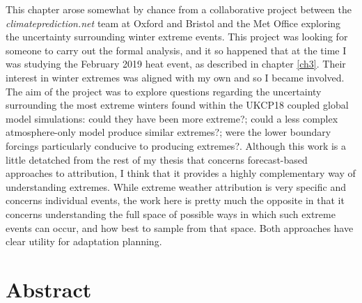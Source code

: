   This chapter arose somewhat by chance from a collaborative project between the \emph{climateprediction.net} team at Oxford and Bristol and the Met Office exploring the uncertainty surrounding winter extreme events. This project was looking for someone to carry out the formal analysis, and it so happened that at the time I was studying the February 2019 heat event, as described in chapter \ref{ch3}. Their interest in winter extremes was aligned with my own and so I became involved. The aim of the project was to explore questions regarding the uncertainty surrounding the most extreme winters found within the UKCP18 coupled global model simulations: could they have been more extreme?; could a less complex atmosphere-only model produce similar extremes?; were the lower boundary forcings particularly conducive to producing extremes?. Although this work is a little detatched from the rest of my thesis that concerns forecast-based approaches to attribution, I think that it provides a highly complementary way of understanding extremes. While extreme weather attribution is very specific and concerns individual events, the work here is pretty much the opposite in that it concerns understanding the full space of possible ways in which such extreme events can occur, and how best to sample from that space. Both approaches have clear utility for adaptation planning.

\section{Abstract}

